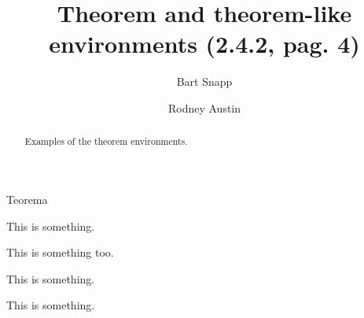 \documentclass{ximera}
\author{Bart Snapp \and Rodney Austin}
\title[Examples:]{Theorem and theorem-like environments (2.4.2, pag. 4)}
\begin{document}
\begin{abstract}
  Examples of the theorem environments.
\end{abstract}
\maketitle


\lipsum[1]
%
\begin{thm} Teorema
\lipsum[1]
\end{thm}

\vspace*{1ex}

\lipsum[1]


\lipsum[1]


\lipsum[1]

\begin{theorem}
  This is something.\lipsum[1]
\end{theorem}

\lipsum[1]

\begin{theorem}[My theorem]
  This is something too.
\end{theorem}

\begin{algorithm}
  This is something.
\end{algorithm}

\begin{axiom}
  This is something.
\end{axiom}
\end{document}
